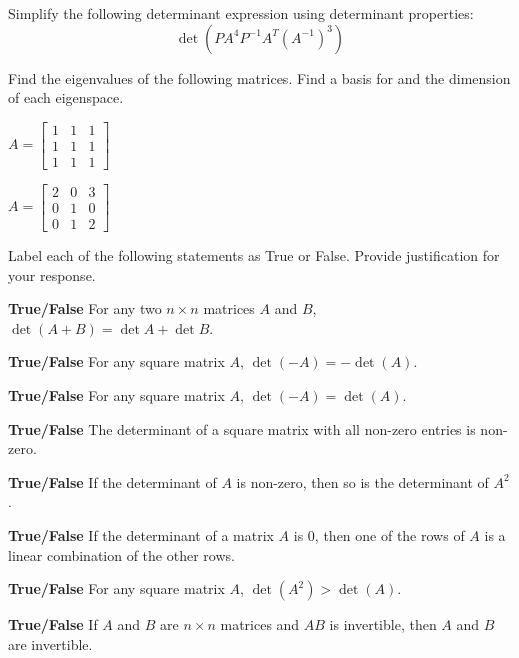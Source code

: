 \item Simplify the following determinant expression using determinant properties:
\[ \det(PA^4P^{-1}A^T(A^{-1})^3) \]

\item Find the eigenvalues of the following matrices. Find a basis for and the dimension of each eigenspace. 

\ba
\item $A=\left[ \begin{array}{ccc} 1&1&1\\1&1&1\\1&1&1\end{array} \right]$

\item $A=\left[ \begin{array}{ccc} 2&0&3\\0&1&0\\0&1&2\end{array} \right]$
\ea
	
	
\item Label each of the following statements as True or False. Provide justification for your response.
\ba
\item \textbf{True/False} For any two $n\times n$ matrices $A$ and $B$, $\det (A+B) = \det A + \det B$.

\item \textbf{True/False} For any square matrix $A$, $\det(-A)= -\det(A)$.

\item \textbf{True/False} For any square matrix $A$, $\det(-A)= \det(A)$.

\item \textbf{True/False} The determinant of a square matrix with all non-zero entries is non-zero.

\item \textbf{True/False} If the determinant of $A$ is non-zero, then so is the determinant of $A^2$.

\item \textbf{True/False} If the determinant of a matrix $A$ is 0, then one of the rows of $A$ is a linear combination of the other rows.

\item \textbf{True/False} For any square matrix $A$, $\det(A^2)>\det(A)$.

\item \textbf{True/False} If $A$ and $B$ are $n \times n$ matrices and $AB$ is invertible, then $A$ and $B$ are invertible.

